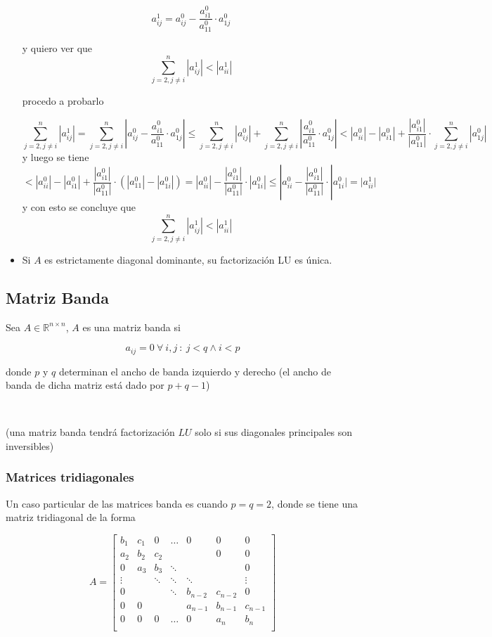 \begin{itemize}
    \[a_{ij}^{1} = a_{ij}^{0} - \frac{a_{i1}^{0}}{a_{11}^{0}}\cdot a_{1j}^{0}\]
    
    y quiero ver que 
    \[\sum_{j = 2, j \neq i}^{n} |a_{ij}^{1}| < |a_{ii}^{1}|\]
    
    procedo a probarlo
    
    \[\sum_{j = 2, j \neq i}^{n} |a_{ij}^{1}| =  \sum_{j=2,j \neq i}^{n}|a_{ij}^{0} - \frac{a_{i1}^{0}}{a_{11}^{0}}\cdot a_{1j}^{0}| \leq \sum_{j=2,j \neq i}^{n}|a_{ij}^{0}| + \sum_{j=2,j \neq i}^{n} |\frac{a_{i1}^{0}}{a_{11}^{0}}\cdot a_{1j}^{0}| < |a_{ii}^{0}|-|a_{i1}^{0}| + \frac{|a_{i1}^{0}|}{|a_{11}^{0}|}\cdot\sum_{j=2, j \neq i}^{n}|a_{1j}^{0}|\]
    y luego se tiene 
    \[< |a_{ii}^{0}|-|a_{i1}^{0}| + \frac{|a_{i1}^{0}|}{|a_{11}^{0}|}\cdot (|a_{11}^{0}| - |a_{1i}^{0}|) = |a_{ii}^{0}| - \frac{|a_{i1}^{0}|}{|a_{11}^{0}|}\cdot |a_{1i}^{0}| \leq |a_{ii}^{0} - \frac{|a_{i1}^{0}|}{|a_{11}^{0}|}\cdot |a_{1i}^{0}| = |a_{ii}^{1}|\]
    y con esto se concluye que
    \[\sum_{j = 2, j \neq i}^{n} |a_{ij}^{1}| < |a_{ii}^{1}|\]
    \item Si $A$ es estrictamente diagonal dominante, su factorización LU es única.
\end{itemize}

\subsection{Matriz Banda}\label{subsec:matriz_banda}

Sea $A \in \mathbb{R}^{n \times n}$, $A$ es una matriz banda si 

\[a_{ij} = 0 ~\forall~ i,j ~:~ j < q \land i < p\]

donde $p$ y $q$ determinan el ancho de banda izquierdo y derecho (el ancho de banda de dicha matriz está dado por $p + q - 1$)

\

(una matriz banda tendrá factorización $LU$ solo si sus diagonales principales son inversibles)

\subsubsection{Matrices tridiagonales}\label{subsubsec:matriz_tridiagonal}

Un caso particular de las matrices banda es cuando $p = q = 2$, donde se tiene una matriz tridiagonal de la forma

\[
A =
\begin{bmatrix}
    b_{1} & c_{1} & 0      & \ldots & 0 & 0 & 0 \\
    a_{2} & b_{2} & c_{2} &   &   & 0 & 0 \\
    0      & a_{3} & b_{3} & \ddots  &   &  & 0 \\
    \vdots &        & \ddots & \ddots & \ddots &  & \vdots \\
    0      &        &        & \ddots & b_{n-2} & c_{n-2} & 0 \\
    0      & 0      &        &  & a_{n-1} & b_{n-1} & c_{n-1} \\
    0      & 0      & 0 & \ldots & 0 & a_{n} & b_{n} \\
\end{bmatrix}
\]

